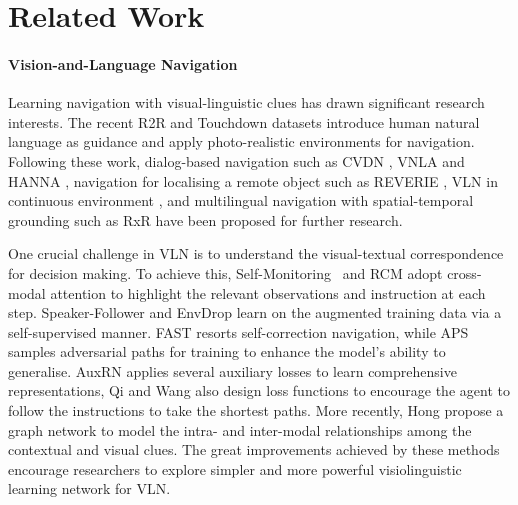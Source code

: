 \documentclass[final]{cvpr}
\begin{document}
 \section{Related Work} 
\label{sec:relatedwork}

\paragraph{Vision-and-Language Navigation}
Learning navigation with visual-linguistic clues has drawn significant research interests. The recent R2R \cite{anderson2018vision} and Touchdown \cite{chen2019touchdown} datasets introduce human natural language as guidance and apply photo-realistic environments for navigation. Following these work, dialog-based navigation such as CVDN \cite{thomason2020vision}, VNLA \cite{nguyen2019vision} and HANNA \cite{nguyen2019help}, navigation for localising a remote object such as REVERIE \cite{qi2020reverie}, VLN in continuous environment \cite{krantz2020navgraph}, and multilingual navigation with spatial-temporal grounding such as RxR \cite{anderson2020rxr} have been proposed for further research. 

One crucial challenge in VLN is to understand the visual-textual correspondence for decision making. To achieve this, Self-Monitoring~\cite{ma2019self} and RCM \cite{wang2019reinforced} adopt cross-modal attention to highlight the relevant observations and instruction at each step. Speaker-Follower \cite{fried2018speaker} and EnvDrop \cite{tan2019learning} learn on the augmented training data via a self-supervised manner. FAST \cite{ke2019tactical} resorts self-correction navigation, while
APS \cite{fu2020counter} samples adversarial paths for training to enhance the model's ability to generalise. AuxRN \cite{zhu2020vision} applies several auxiliary losses to learn comprehensive representations, Qi \etal \cite{qi2020object} and Wang \etal \cite{wang2020soft} also design loss functions to encourage the agent to follow the instructions to take the shortest paths. More recently, Hong \etal \cite{hong2020graph} propose a graph network to model the intra- and inter-modal relationships among the contextual and visual clues. The great improvements achieved by these methods encourage researchers to explore simpler and more powerful visiolinguistic learning network for VLN.

\vspace{-15pt}
\end{document}
